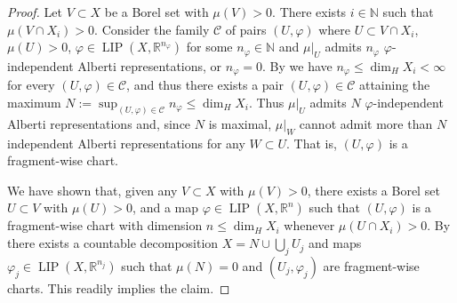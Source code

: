 \documentclass{amsart}
\numberwithin{equation}{section}
\newcommand{\R}{\mathbb{R}}
\newcommand{\N}{\mathbb{N}}
\newcommand{\LIP}{\operatorname{LIP}}
\begin{document}
\begin{proof}%
	Let $V\subset X$ be a Borel set with $\mu(V)>0$. There exists $i\in\N$ such that $\mu(V\cap X_i)>0$. Consider the family $\mathcal C$ of pairs $(U,\varphi)$ where $U\subset V\cap X_i$, $\mu(U)>0$, $\varphi\in \LIP(X,\R^{n_{\varphi}})$ for some $n_\varphi\in\N$ and $\mu|_U$ admits $n_\varphi$ $\varphi$-independent Alberti representations, or $n_\varphi=0$. By \cite[Theorem 5.3]{bkt19} we have $n_\varphi\le \dim_HX_i<\infty$ for every $(U,\varphi)\in \mathcal C$, and thus there exists a pair $(U,\varphi)\in\mathcal C$ attaining the maximum $N:=\sup_{(U,\varphi)\in \mathcal C} n_\varphi\le \dim_HX_i$. Thus $\mu|_U$ admits $N$ $\varphi$-independent Alberti representations and, since $N$ is maximal, $\mu|_W$ cannot admit more than $N$ independent Alberti representations for any $W\subset U$. That is, $(U,\varphi)$ is a fragment-wise chart. 
	
	We have shown that, given any $V\subset X$ with $\mu(V)>0$, there exists a Borel set $U\subset V$ with $\mu(U)>0$, and a map $\varphi\in\LIP(X,\R^n)$ such that $(U,\varphi)$ is a fragment-wise chart with dimension $n\le \dim_HX_i$ whenever $\mu(U\cap X_i)>0$. By  \cite[Proposition 3.1.1]{kei02} there exists a countable decomposition $X=N\cup\bigcup_jU_j$ and maps $\varphi_j\in\LIP(X,\R^{n_j})$ such that $\mu(N)=0$ and $(U_j,\varphi_j)$ are fragment-wise charts. This readily implies the claim.
\end{proof}
\end{document}
